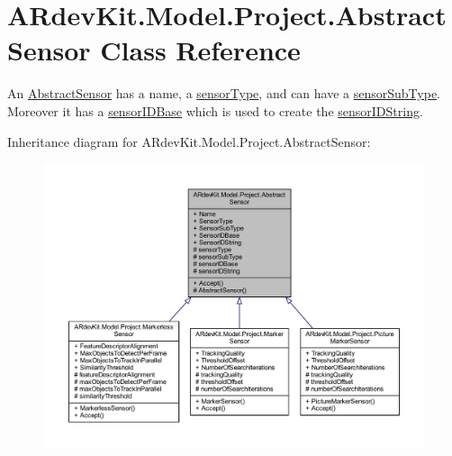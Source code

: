 \hypertarget{class_a_rdev_kit_1_1_model_1_1_project_1_1_abstract_sensor}{\section{A\-Rdev\-Kit.\-Model.\-Project.\-Abstract\-Sensor Class Reference}
\label{class_a_rdev_kit_1_1_model_1_1_project_1_1_abstract_sensor}
}


An \hyperlink{class_a_rdev_kit_1_1_model_1_1_project_1_1_abstract_sensor}{Abstract\-Sensor} has a name, a \hyperlink{class_a_rdev_kit_1_1_model_1_1_project_1_1_abstract_sensor_a01251db96ea5e0fb0abe1df0a129e751}{sensor\-Type}, and can have a \hyperlink{class_a_rdev_kit_1_1_model_1_1_project_1_1_abstract_sensor_a29b9e916f374e31196689e9d7ac73123}{sensor\-Sub\-Type}. Moreover it has a \hyperlink{class_a_rdev_kit_1_1_model_1_1_project_1_1_abstract_sensor_a2f9524a6aba4331373c0c1968b2f6f4d}{sensor\-I\-D\-Base} which is used to create the \hyperlink{class_a_rdev_kit_1_1_model_1_1_project_1_1_abstract_sensor_ae12a6c3bfe5686d888d7e36c9b19df47}{sensor\-I\-D\-String}.  




Inheritance diagram for A\-Rdev\-Kit.\-Model.\-Project.\-Abstract\-Sensor\-:
\nopagebreak
\begin{figure}[H]
\begin{center}
\leavevmode
\includegraphics[width=350pt]{class_a_rdev_kit_1_1_model_1_1_project_1_1_abstract_sensor__inherit__graph}
\end{center}
\end{figure}


